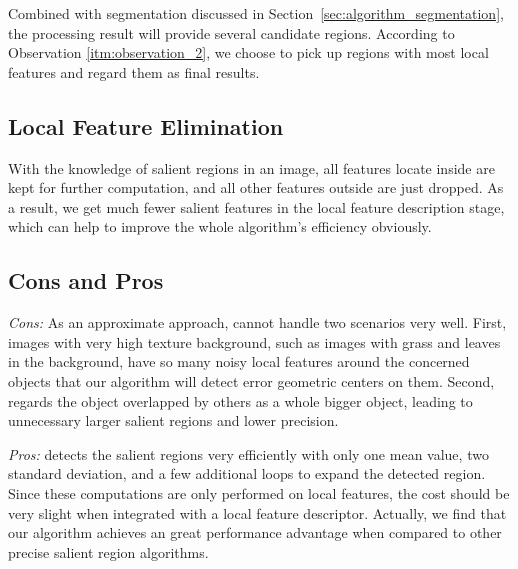 Combined with segmentation discussed in Section~\ref{sec:algorithm_segmentation}, the processing result will provide several candidate regions. According to Observation \ref{itm:observation_2}, we choose to pick up regions with most local features and regard them as final results.

\subsection{Local Feature Elimination}
\label{sec:algorithm_elimation}

With the knowledge of salient regions in an image, all features locate inside are kept for further computation, and all other features outside are just dropped. As a result, we get much fewer salient features in the local feature description stage, which can help to improve the whole algorithm's efficiency obviously.

\subsection{Cons and Pros}
\label{sec:algorithm_summary}

\textit{Cons:} As an approximate approach, {\sys} cannot handle two scenarios very well. First, images with very high texture background, such as images with grass and leaves in the background, have so many noisy local features around the concerned objects that our algorithm will detect error geometric centers on them. Second, {\sys} regards the object overlapped by others as a whole bigger object, leading to unnecessary larger salient regions and lower precision.

\textit{Pros:} {\sys} detects the salient regions very efficiently with only one mean value, two standard deviation, and a few additional loops to expand the detected region. Since these computations are only performed on local features, the cost should be very slight when integrated with a local feature descriptor. Actually, we find that our algorithm achieves an great performance advantage when compared to other precise salient region algorithms. 

